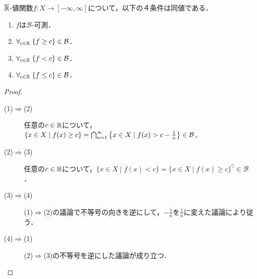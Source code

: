\documentclass[uplatex, dvipdfmx]{jsreport}
\renewcommand{\B}{\mathcal{B}}
\begin{document}
\begin{lemma}[拡張実可測関数の特徴付け]\label{lemma-characterization-of-measurable-function}
    $\overline{\mathbb{R}}$-値関数$f:X\to[-\infty,\infty]$について，以下の４条件は同値である．
    \begin{enumerate}
        \item $f$は$\B$-可測．
        \item $\forall_{c\in\R}\;\{f\ge c\}\in\B$．
        \item $\forall_{c\in\R}\;\{f< c\}\in\B$．
        \item $\forall_{c\in\R}\;\{f\le c\}\in\B$．
    \end{enumerate}
\end{lemma}
\begin{proof}\mbox{}
    \begin{description}
        \item[(1)$\Rightarrow$(2)] 任意の$c\in\mathbb{R}$について，$\{x\in X\mid f(x)\ge c\}=\bigcap_{n=1}^\infty\Brace{x\in X\mid f(x)>c-\frac{1}{n}}\in\B$．
        \item[(2)$\Rightarrow$(3)] 任意の$c\in\mathbb{R}$について，$\{x\in X\mid f(x)< c\}=\{x\in X\mid f(x)\ge c\}^\complement\in\B$．
        \item[(3)$\Rightarrow$(4)] (1)$\Rightarrow$(2)の議論で不等号の向きを逆にして，$-\frac{1}{n}$を$\frac{1}{n}$に変えた議論により従う．
        \item[(4)$\Rightarrow$(1)] (2)$\Rightarrow$(3)の不等号を逆にした議論が成り立つ．
    \end{description}
\end{proof}
\end{document}

